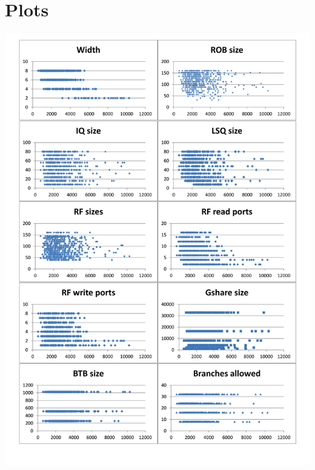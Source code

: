 \documentclass[a4paper, 11pt]{article}
\begin{document}
\section{Plots}\label{plots}
\includegraphics[height=0.8\textheight]{graph.png}
\end{document}
